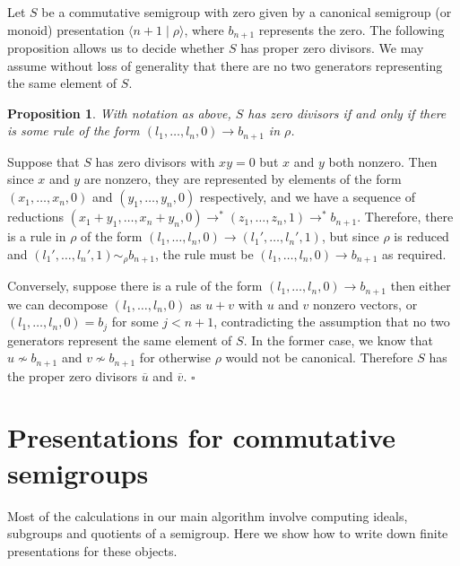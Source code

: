 \documentclass[12pt]{article}
\newtheorem{proposition}{\bf Proposition}
\newenvironment{proof}{{\it Proof.\/}}{$\square$\\}
\begin{document}
Let $S$ be a commutative semigroup with zero
given by a canonical semigroup (or monoid)
presentation $\langle n + 1 \mid \rho \rangle$, where $b_{n+1}$
represents the zero. The following proposition allows us to decide
whether $S$ has proper zero divisors. We may assume without loss
of generality that there are no two generators representing the same
element of $S$.

\begin{proposition}
With notation as above, $S$ has zero divisors if and only if
there is some rule of the form $(l_1, \ldots, l_n,0) \rightarrow
b_{n+1}$
in $\rho$.
\end{proposition}

\begin{proof}
Suppose that $S$ has zero divisors with $xy = 0$ but
$x$ and $y$ both nonzero. Then since $x$ and $y$ are nonzero,
they are represented by elements of the form 
$(x_1, \ldots, x_n,0)$ and $(y_1, \ldots, y_n,0)$
respectively, and we have a sequence of reductions
$(x_1 + y_1, \ldots, x_n + y_n,0) \rightarrow^* (z_1, \ldots, z_n,1)
\rightarrow^* b_{n+1}$.
Therefore, there is a rule in $\rho$ of the form
$(l_1, \ldots, l_n,0) \rightarrow (l_1', \ldots, l_n',1)$, but since
$\rho$ is reduced and $(l_1', \ldots, l_n',1) \sim_\rho b_{n+1}$,
the rule must be $(l_1, \ldots, l_n,0) \rightarrow b_{n+1}$ as required.

Conversely, suppose there is a rule of the form
$(l_1, \ldots, l_n,0) \rightarrow b_{n+1}$ then either
we can decompose $(l_1, \ldots, l_n,0)$ as $u + v$ with
$u$ and $v$ nonzero vectors, or
$(l_1, \ldots, l_n,0) =  b_j$ for some $j < n+1$, contradicting
the assumption that no two generators represent the same element of
$S$. In the former case, we know that $u \not\sim b_{n+1}$ and 
$v \not\sim b_{n+1}$ for otherwise $\rho$ would not be canonical. 
Therefore $S$ has the proper
zero divisors $\overline{u}$ and $\overline{v}$.  
\end{proof}

\section{Presentations for commutative semigroups}

Most of the calculations in our main algorithm 
involve computing
ideals, subgroups and quotients of a semigroup. 
Here we show how to write down finite presentations 
for these objects.
\end{document}
